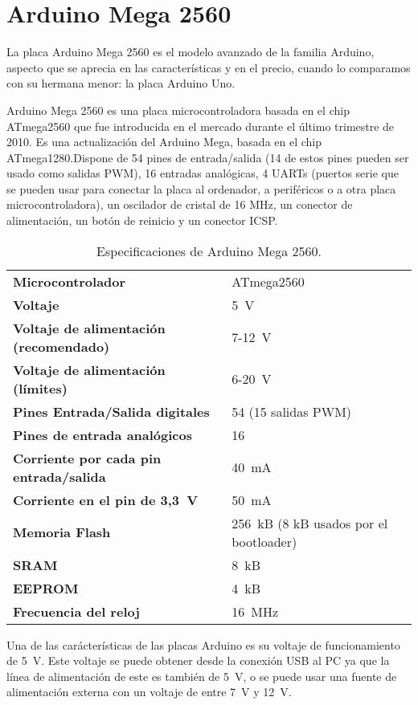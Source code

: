 \section{Arduino Mega 2560}
La placa Arduino Mega 2560 es el modelo avanzado de la familia Arduino, aspecto que se aprecia en las características y en el precio, cuando lo comparamos con su hermana menor: la placa Arduino Uno.


Arduino Mega 2560 es una placa microcontroladora basada en el chip ATmega2560 que fue introducida en el mercado durante el último trimestre de 2010.  
Es una actualización del Arduino Mega, basada en el chip ATmega1280.\@ Dispone de 54 pines de entrada/salida (14 de estos pines pueden ser usado como salidas PWM), 16 entradas analógicas, 4 UARTs (puertos serie que se pueden usar para conectar la placa al ordenador, a periféricos o a otra placa microcontroladora), un oscilador de cristal de 16 MHz, un conector de alimentación, un botón de reinicio y un conector ICSP.\@

\begin{table}
\begin{center}
\begin{tabular}{ll}
  \textbf{Microcontrolador} 						& ATmega2560 \\
  \textbf{Voltaje}									& 5~V \\
  \textbf{Voltaje de alimentación (recomendado)} 	& 7-12~V \\
  \textbf{Voltaje de alimentación (límites)} 		& 6-20~V \\
  \textbf{Pines Entrada/Salida digitales}			& 54 (15 salidas PWM) \\
  \textbf{Pines de entrada analógicos}				& 16 \\
  \textbf{Corriente por cada pin entrada/salida} 	& 40~mA \\
  \textbf{Corriente en el pin de 3,3~V}				& 50~mA \\
  \textbf{Memoria Flash} 							& 256~kB (8 kB usados por el bootloader) \\
  \textbf{SRAM}									& 8~kB \\
  \textbf{EEPROM}									& 4~kB \\
  \textbf{Frecuencia del reloj}					& 16~MHz \\
\end{tabular}
\end{center}
\caption{Especificaciones de Arduino Mega 2560.}
\label{tab:mega2560_specs}
\end{table}
Una de las carácterísticas de las placas Arduino es su voltaje de funcionamiento de 5~V. Este voltaje se puede obtener desde la conexión USB al PC ya que la línea de alimentación de este es también de 5~V, o se puede usar una fuente de alimentación externa con un voltaje de entre 7~V y 12~V.

